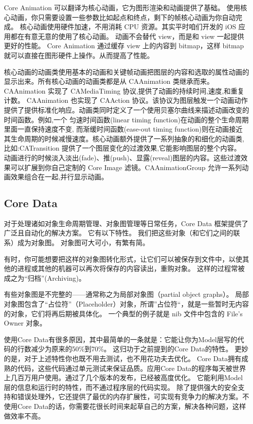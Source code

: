 Core Animation 可以翻译为核心动画，它为图形渲染和动画提供了基础。
使用核心动画，你只需要设置一些参数比如起点和终点，剩下的帧核心动画为你自动完成。
核心动画使用硬件加速，不用消耗 CPU 资源。其实平时咱们开发的 iOS 应用都在有意无意的使用了核心动画。
动画不会替代 view，而是和 view 一起提供更好的性能。
Core Animation 通过缓存 view 上的内容到 bitmap，这样 bitmap 就可以直接在图形硬件上操作。从而提高了性能。

核心动画的动画类使用基本的动画和关键帧动画把图层的内容和选取的属性动画的显示出来。所有核心动画的动画类都是从 CAAnimation 类继承而来。
CAAnimation 实现了 CAMediaTiming 协议,提供了动画的持续时间,速度,和重复计数。 CAAnimation 也实现了 CAAction 协议。该协议为图层触发一个动画动作提供了提供标准化响应。动画类同时定义了一个使用贝塞尔曲线来描述动画改变的时间函数。例如,一个 匀速时间函数(linear timing function)在动画的整个生命周期里面一直保持速度不变, 而渐缓时间函数(ease-out timing function)则在动画接近其生命周期的时候减慢速度。核心动画额外提供了一系列抽象的和细化的动画类,比如:CATransition 提供了一个图层变化的过渡效果,它能影响图层的整个内容。 动画进行的时候淡入淡出(fade)、推(push)、显露(reveal)图层的内容。这些过渡效 果可以扩展到你自己定制的 Core Image 滤镜。CAAnimationGroup 允许一系列动画效果组合在一起,并行显示动画。

\subsection{Core Data}

对于处理诸如对象生命周期管理、对象图管理等日常任务，Core Data 框架提供了广泛且自动化的解决方案。
它有以下特性。
我们把这些对象（和它们之间的联系）成为对象图。 对象图可大可小，有繁有简。

有时，你可能想要把这样的对象图转化形式，让它们可以被保存到文件中，以使其他的进程或其他的机器可以再次将保存的内容读出，重购对象。 这样的过程常被成之为“归档”(Archiving)。

有些对象图是不完整的——通常称之为局部对象图（partial object graphs）。
局部对象图包含了“占位符”（Placeholder）对象，所谓”占位符“，就是一些暂时无内容的对象，它们将再后期被具体化。
一个典型的例子就是 nib 文件中包含的 File's Owner 对象。

使用Core Data有很多原因，其中最简单的一条就是：它能让你为Model层写的代码的行数减少为原来的50\%到70\%。 这归功于之前提到的Core Data的特性。
更妙的是，对于上述特性你也既不用去测试，也不用花功夫去优化。
Core Data拥有成熟的代码，这些代码通过单元测试来保证品质。应用Core Data的程序每天被世界上几百万用户使用。通过了几个版本的发布，已经被高度优化。 它能利用Model层的信息和运行时的特性，而不通过程序层的代码实现。 除了提供强大的安全支持和错误处理外，它还提供了最优的内存扩展性，可实现有竞争力的解决方案。不使用Core Data的话，你需要花很长时间来起草自己的方案，解决各种问题，这样做效率不高。

